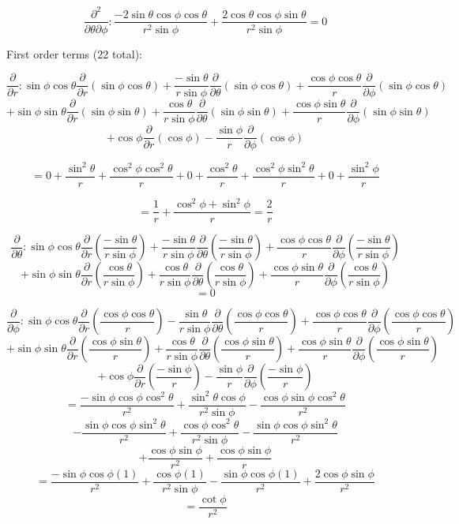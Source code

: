 \documentclass{article}
\begin{document}
$$\frac{\partial^{2}}{\partial\theta \partial\phi}: \frac{-2\sin\theta\cos\phi\cos\theta}{r^{2}\sin\phi} + \frac{2\cos\theta\cos\phi\sin\theta}{r^{2}\sin\phi}=0$$

First order terms (22 total):

$$\frac{\partial}{\partial r}: \sin\phi\cos\theta\frac{\partial}{\partial r}(\sin\phi\cos\theta) + \frac{-\sin\theta}{r\sin\phi}\frac{\partial}{\partial \theta}(\sin\phi\cos\theta) + \frac{\cos\phi\cos\theta}{r}\frac{\partial}{\partial\phi}(\sin\phi\cos\theta) $$
$$+\sin\phi\sin\theta\frac{\partial}{\partial r}(\sin\phi\sin\theta)+\frac{\cos\theta}{r\sin\phi}\frac{\partial}{\partial \theta}(\sin\phi\sin\theta)+\frac{\cos\phi\sin\theta}{r}\frac{\partial}{\partial\phi}(\sin\phi\sin\theta)$$
$$+\cos\phi\frac{\partial}{\partial r}(\cos\phi) - \frac{\sin\phi}{r}\frac{\partial}{\partial \phi}(\cos\phi)$$

$$=0+\frac{\sin^{2}\theta}{r}+\frac{\cos^{2}\phi\cos^{2}\theta}{r} + 0 + \frac{\cos^{2}\theta}{r} + \frac{\cos^{2}\phi\sin^{2}\theta}{r}+0+\frac{\sin^{2}\phi}{r}$$

$$=\frac{1}{r}+\frac{\cos^{2}\phi +\sin^{2}\phi}{r}=\frac{2}{r}$$

$$\frac{\partial}{\partial \theta}: \sin\phi\cos\theta\frac{\partial}{\partial r}(\frac{-\sin\theta}{r\sin\phi}) + \frac{-\sin\theta}{r\sin\phi}\frac{\partial}{\partial \theta}(\frac{-\sin\theta}{r\sin\phi}) + \frac{\cos\phi\cos\theta}{r}\frac{\partial}{\partial \phi}(\frac{-\sin\theta}{r\sin\phi})$$ 
$$+ \sin\phi\sin\theta\frac{\partial}{\partial r}(\frac{\cos\theta}{r\sin\phi}) + \frac{\cos\theta}{r\sin\phi}\frac{\partial}{\partial\theta}(\frac{\cos\theta}{r\sin\phi}) + \frac{\cos\phi\sin\theta}{r}\frac{\partial}{\partial \phi}(\frac{\cos\theta}{r\sin\phi})$$
$$=0$$

$$\frac{\partial}{\partial \phi}: \sin\phi\cos\theta\frac{\partial}{\partial r}(\frac{\cos\phi\cos\theta}{r}) - \frac{\sin\theta}{r\sin\phi}\frac{\partial}{\partial\theta}(\frac{\cos\phi\cos\theta}{r}) + \frac{\cos\phi\cos\theta}{r}\frac{\partial}{\partial\phi}(\frac{\cos\phi\cos\theta}{r})$$
$$+\sin\phi\sin\theta\frac{\partial}{\partial r}(\frac{\cos\phi\sin\theta}{r}) + \frac{\cos\theta}{r\sin\phi}\frac{\partial}{\partial\theta}(\frac{\cos\phi\sin\theta}{r}) + \frac{\cos\phi\sin\theta}{r}\frac{\partial}{\partial\phi}(\frac{\cos\phi\sin\theta}{r})$$
$$+\cos\phi\frac{\partial}{\partial r}(\frac{-\sin\phi}{r})-\frac{\sin\phi}{r}\frac{\partial}{\partial\phi}(\frac{-\sin\phi}{r})$$
$$=\frac{-\sin\phi\cos\phi\cos^{2}\theta}{r^{2}}+\frac{\sin^{2}\theta\cos\phi}{r^{2}\sin\phi}-\frac{\cos\phi\sin\phi\cos^{2}\theta}{r^{2}}$$
$$-\frac{\sin\phi\cos\phi\sin^{2}\theta}{r^{2}}+\frac{\cos\phi\cos^{2}\theta}{r^{2}\sin\phi}-\frac{\sin\phi\cos\phi\sin^{2}\theta}{r^{2}}$$
$$+\frac{\cos\phi\sin\phi}{r^{2}}+\frac{\cos\phi\sin\phi}{r}$$
$$=\frac{-\sin\phi\cos\phi(1)}{r^{2}}+\frac{\cos\phi(1)}{r^{2}\sin\phi} - \frac{\sin\phi\cos\phi(1)}{r^{2}} + \frac{2\cos\phi\sin\phi}{r^{2}}$$
$$=\frac{\cot\phi}{r^{2}}$$
\end{document}
